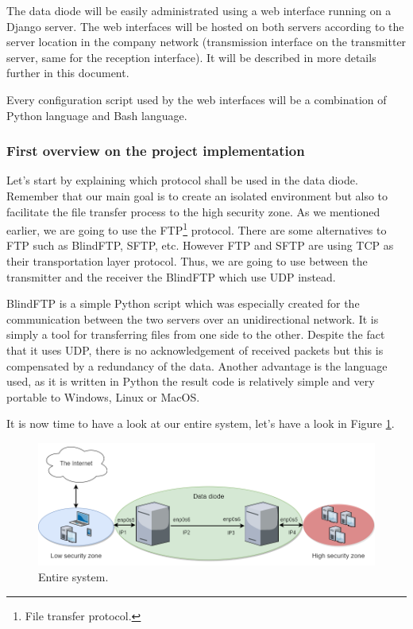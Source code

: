 \documentclass[a4paper,10pt]{article}
\begin{document}
The data diode will be easily administrated using a web interface running on a Django server. The web interfaces will be hosted on both servers according to the server location in the company network (transmission interface on the transmitter server, same for the reception interface). It will be described in more details further in this document.

Every configuration script used by the web interfaces will be a combination of Python language and Bash language.
\subsubsection{First overview on the project implementation}

Let's start by explaining which protocol shall be used in the data diode. Remember that our main goal is to create an isolated environment but also to facilitate the file transfer process to the high security zone. As we mentioned earlier, we are going to use the FTP\footnote{File transfer protocol.} protocol. There are some alternatives to FTP such as BlindFTP, SFTP, etc. However FTP and SFTP are using TCP as their transportation layer protocol. Thus, we are going to use between the transmitter and the receiver the BlindFTP which use UDP instead.

BlindFTP is a simple Python script which was especially created for the communication between the two servers over an unidirectional network. It is simply a tool for transferring files from one side to the other. Despite the fact that it uses UDP, there is no acknowledgement of received packets but this is compensated by a redundancy of the data. Another advantage is the language used, as it is written in Python the result code is relatively simple and very portable to Windows, Linux or MacOS.

It is now time to have a look at our entire system, let's have a look in Figure \ref{fig:sysschem}.\bigskip

\begin{figure}
\centering
\includegraphics[scale=0.5]{images/DataDiodeSchema.png}
\caption{Entire system.}
\label{fig:sysschem}
\end{figure}
\end{document}
